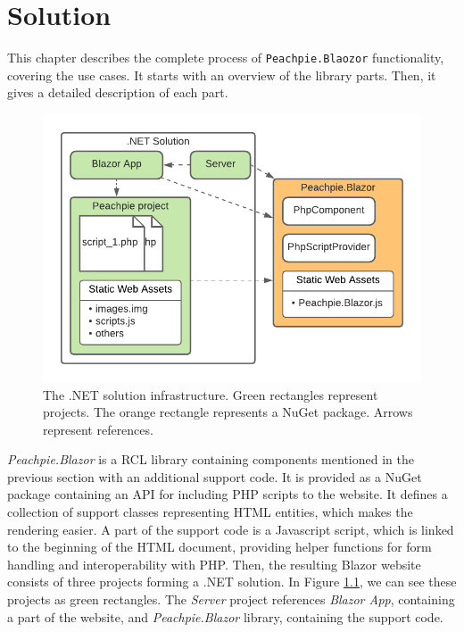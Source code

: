 \chapter{Solution}

This chapter describes the complete process of \texttt{Peachpie.Blaozor} functionality, covering the use cases.
It starts with an overview of the library parts.
Then, it gives a detailed description of each part.
\par
\begin{figure}[b!]
\centering
\includegraphics[scale=0.9]{./img/SolutionInfrastructure}
\caption{The .NET solution infrastructure. Green rectangles represent projects. The orange rectangle represents a NuGet package. Arrows represent references.}
\label{img13:infrastructure}
\end{figure} 
\par
\textit{Peachpie.Blazor} is a RCL library containing components mentioned in the previous section with an additional support code.
It is provided as a NuGet package containing an API for including PHP scripts to the website.
It defines a collection of support classes representing HTML entities, which makes the rendering easier.
A part of the support code is a Javascript script, which is linked to the beginning of the HTML document, providing helper functions for form handling and interoperability with PHP.
Then, the resulting Blazor website consists of three projects forming a .NET solution.
In Figure \ref{img13:infrastructure}, we can see these projects as green rectangles.
The \textit{Server} project references \textit{Blazor App}, containing a part of the website, and \textit{Peachpie.Blazor} library, containing the support code.
